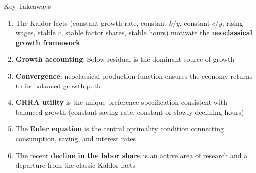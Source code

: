 \documentclass[blue]{beamer}
\begin{document}
\begin{frame}{Key Takeaways}
	\begin{enumerate}
		\item The Kaldor facts (constant growth rate, constant $k/y$, constant $c/y$, rising wages, stable $r$, stable factor shares, stable hours) motivate the \textbf{neoclassical growth framework}
		
		\item \textbf{Growth accounting}: Solow residual is the dominant source of growth
		
	
		\item \textbf{Convergence}: neoclassical production function ensures the economy returns to its balanced growth path
		
		\item \textbf{CRRA utility} is the unique preference specification consistent with balanced growth (constant saving rate, constant or slowly declining hours)
		
		\item The \textbf{Euler equation} is the central optimality condition connecting consumption, saving, and interest rates
		
		\item The recent \textbf{decline in the labor share} is an active area of research and a departure from the classic Kaldor facts
	\end{enumerate}
\end{frame}
\end{document}
